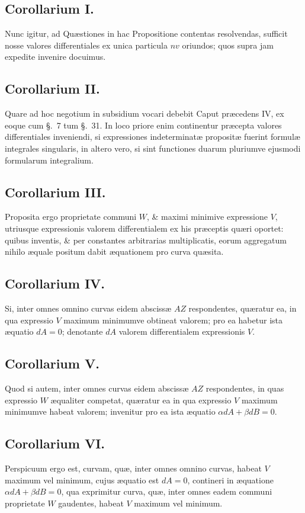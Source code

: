 \subsection*{Corollarium I.}
Nunc igitur, ad Quæstiones in hac Propositione contentas resolvendas, sufficit nosse valores differentiales ex unica particula $nv$ oriundos; quos supra jam expedite invenire docuimus.

\subsection*{Corollarium II.}
Quare ad hoc negotium in subsidium vocari debebit Caput præcedens IV, ex eoque cum §.~7 tum §.~31. In loco priore enim continentur præcepta valores differentiales inveniendi, si expressiones indeterminatæ propositæ fuerint formulæ integrales singularis, in altero vero, si sint functiones duarum pluriumve ejusmodi formularum integralium.

\subsection*{Corollarium III.}
Proposita ergo proprietate communi $W$, \& maximi minimive expressione $V$, utriusque expressionis valorem differentialem ex his præceptis quæri oportet: quibus inventis, \& per constantes arbitrarias multiplicatis, eorum aggregatum nihilo æquale positum dabit æquationem pro curva quæsita.

\subsection*{Corollarium IV.}
Si, inter omnes omnino curvas eidem abscissæ $AZ$ respondentes, quæratur ea, in qua expressio $V$ maximum minimumve obtineat valorem; pro ea habetur ista æquatio $dA=0$; denotante $dA$ valorem differentialem expressionis $V$.

\subsection*{Corollarium V.}
Quod si autem, inter omnes curvas eidem abscissæ $AZ$ respondentes, in quas expressio $W$ æqualiter competat, quæratur ea in qua expressio $V$ maximum minimumve habeat valorem; invenitur pro ea ista æquatio $\alpha dA+\beta dB=0$.

\subsection*{Corollarium VI.}
Perspicuum ergo est, curvam, quæ, inter omnes omnino curvas, habeat $V$ maximum vel minimum, cujus æquatio est $dA=0$, contineri in æquatione $\alpha dA+\beta dB=0$, qua exprimitur curva, quæ, inter omnes eadem communi proprietate $W$ gaudentes, habeat $V$ maximum vel minimum.

